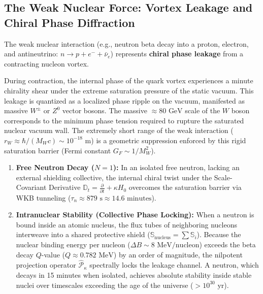 \subsection{The Weak Nuclear Force: Vortex Leakage and Chiral Phase Diffraction}
The weak nuclear interaction (e.g., neutron beta decay into a proton, electron, and antineutrino: $n \to p + e^- + \bar{\nu}_e$) represents \textbf{chiral phase leakage} from a contracting nucleon vortex.

During contraction, the internal phase of the quark vortex experiences a minute chirality shear under the extreme saturation pressure of the static vacuum. This leakage is quantized as a localized phase ripple on the vacuum, manifested as massive $W^\pm$ or $Z^0$ vector bosons. The massive $\approx 80\text{ GeV}$ scale of the $W$ boson corresponds to the minimum phase tension required to rupture the saturated nuclear vacuum wall. The extremely short range of the weak interaction ($r_W \approx \hbar / (M_W c) \sim 10^{-18}\text{ m}$) is a geometric suppression enforced by this rigid saturation barrier (Fermi constant $G_F \sim 1/M_W^2$).

\begin{enumerate}
    \item \textbf{Free Neutron Decay ($N=1$):} In an isolated free neutron, lacking an external shielding collective, the internal chiral twist under the Scale-Covariant Derivative $\mathbb{D}_t = \frac{\partial}{\partial t} + \kappa H_0$ overcomes the saturation barrier via WKB tunneling ($\tau_n \approx 879\text{ s} \approx 14.6\text{ minutes}$).
    \item \textbf{Intranuclear Stability (Collective Phase Locking):} When a neutron is bound inside an atomic nucleus, the flux tubes of neighboring nucleons interweave into a shared protective shield ($\mathbb{S}_{\mathrm{nucleus}} = \sum \mathbb{S}_i$). Because the nuclear binding energy per nucleon ($\Delta B \sim 8\text{ MeV/nucleon}$) exceeds the beta decay $Q$-value ($Q \approx 0.782\text{ MeV}$) by an order of magnitude, the nilpotent projection operator $\hat{\mathcal{P}}_\kappa$ spectrally locks the leakage channel. A neutron, which decays in 15 minutes when isolated, achieves absolute stability inside stable nuclei over timescales exceeding the age of the universe ($> 10^{30}\text{ yr}$).
\end{enumerate}

